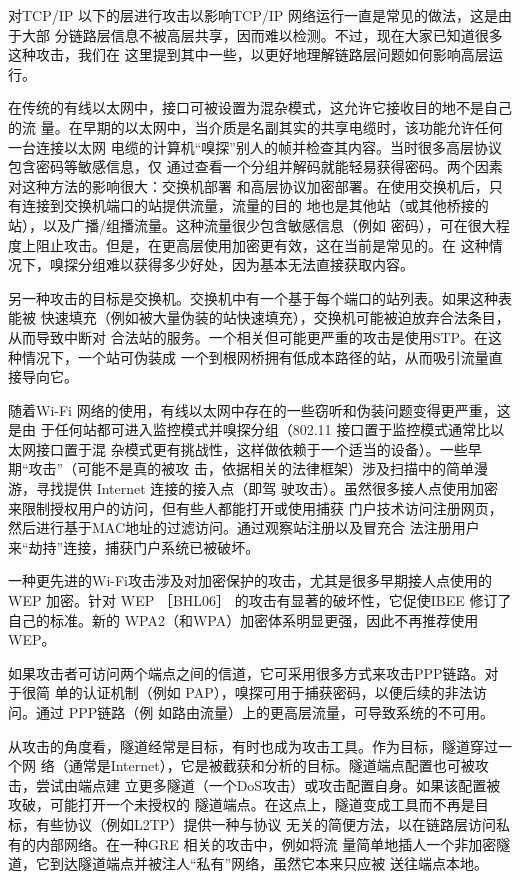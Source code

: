 对TCP/IP 以下的层进行攻击以影响TCP/IP 网络运行一直是常见的做法，这是由于大部
分链路层信息不被高层共享，因而难以检测。不过，现在大家已知道很多这种攻击，我们在
这里提到其中一些，以更好地理解链路层问题如何影响高层运行。

在传统的有线以太网中，接口可被设置为混杂模式，这允许它接收目的地不是自己的流
量。在早期的以太网中，当介质是名副其实的共享电缆时，该功能允许任何一台连接以太网
电缆的计算机“嗅探”别人的帧并检查其内容。当时很多高层协议包含密码等敏感信息，仅
通过查看一个分组并解码就能轻易获得密码。两个因素对这种方法的影响很大：交换机部署
和高层协议加密部署。在使用交换机后，只有连接到交换机端口的站提供流量，流量的目的
地也是其他站（或其他桥接的站），以及广播/组播流量。这种流量很少包含敏感信息（例如
密码），可在很大程度上阻止攻击。但是，在更高层使用加密更有效，这在当前是常见的。在
这种情况下，嗅探分组难以获得多少好处，因为基本无法直接获取内容。

另一种攻击的目标是交换机。交换机中有一个基于每个端口的站列表。如果这种表能被
快速填充（例如被大量伪装的站快速填充），交换机可能被迫放弃合法条目，从而导致中断对
合法站的服务。一个相关但可能更严重的攻击是使用STP。在这种情况下，一个站可伪装成
一个到根网桥拥有低成本路径的站，从而吸引流量直接导向它。

随着Wi-Fi 网络的使用，有线以太网中存在的一些窃听和伪装问题变得更严重，这是由
于任何站都可进入监控模式并嗅探分组（802.11 接口置于监控模式通常比以太网接口置于混
杂模式更有挑战性，这样做依赖于一个适当的设备）。一些早期“攻击”（可能不是真的被攻
击，依据相关的法律框架）涉及扫描中的简单漫游，寻找提供 Internet 连接的接入点（即驾
驶攻击）。虽然很多接人点使用加密来限制授权用户的访问，但有些人都能打开或使用捕获
门户技术访问注册网页，然后进行基于MAC地址的过滤访问。通过观察站注册以及冒充合
法注册用户来“劫持”连接，捕获门户系统已被破坏。

一种更先进的Wi-Fi攻击涉及对加密保护的攻击，尤其是很多早期接人点使用的 WEP
加密。针对 WEP ［BHL06］ 的攻击有显著的破坏性，它促使IBEE 修订了自己的标准。新的
WPA2（和WPA）加密体系明显更强，因此不再推荐使用WEP。

如果攻击者可访问两个端点之间的信道，它可采用很多方式来攻击PPP链路。对于很简
单的认证机制（例如 PAP），嗅探可用于捕获密码，以便后续的非法访问。通过 PPP链路（例
如路由流量）上的更高层流量，可导致系统的不可用。

从攻击的角度看，隧道经常是目标，有时也成为攻击工具。作为目标，隧道穿过一个网
络（通常是Internet），它是被截获和分析的目标。隧道端点配置也可被攻击，尝试由端点建
立更多隧道（一个DoS攻击）或攻击配置自身。如果该配置被攻破，可能打开一个未授权的
隧道端点。在这点上，隧道变成工具而不再是目标，有些协议（例如L2TP）提供一种与协议
无关的简便方法，以在链路层访问私有的内部网络。在一种GRE 相关的攻击中，例如将流
量简单地插人一个非加密隧道，它到达隧道端点并被注人“私有”网络，虽然它本来只应被
送往端点本地。

